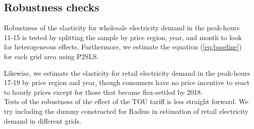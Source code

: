 \subsection{Robustness checks}
\label{subsec:e_robustness}
Robustness of the elasticity for wholesale electricity demand in the peak-hours 11-15 is tested by splitting the sample by price region, year, and month to look for heterogeneous effects. Furthermore, we estimate the equation (\ref{eq:baseline}) for each grid area  using P2SLS.
\par
Likewise, we estimate the elasticity for retail electricity demand in the peak-hours 17-19 by price region and year, though consumers have no price incentive to react to hourly prices except for those that become flex-settled by 2018.
\medskip\\
Tests of the robustness of the effect of the TOU tariff is less straight forward. We try including the dummy constructed for Radius in estimation of retail electricity demand in different grids.
